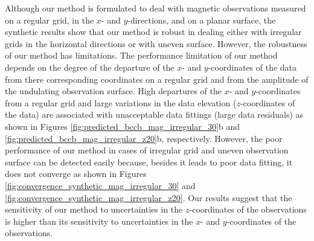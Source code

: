 Although our method is formulated to deal with magnetic observations measured on a regular grid, in 
the $x$- and $y$-directions, and on a planar surface, the synthetic results show that our method is 
robust in dealing either with irregular grids in the horizontal directions or with uneven surface.
However, the robustness of our method has limitations.
The performance limitation of our method depends on the degree of the 
departure of the $x$- and $y$-coordinates of the data from there corresponding coordinates on a regular grid
and from the amplitude of the undulating observation surface.
High departures of the $x$- and $y$-coordinates  from a regular grid and large variations in the data elevation ($z$-coordinates of the data) are associated with unacceptable data fittings (large data residuals) as shown in Figures \ref{fig:predicted_bccb_mag_irregular_30}b and \ref{fig:predicted_bccb_mag_irregular_z20}b, respectively.
However, the poor performance of our method in cases of irregular grid and uneven observation surface can be detected easily because, besides it leads to poor data fitting, it does not converge as shown in
Figures \ref{fig:convergence_synthetic_mag_irregular_30}  and \ref{fig:convergence_synthetic_mag_irregular_z20}.
Our results suggest that the sensitivity of our method to uncertainties in the $z$-coordinates of the observations is higher than its sensitivity to uncertainties in the $x$- and $y$-coordinates of the observations. 
